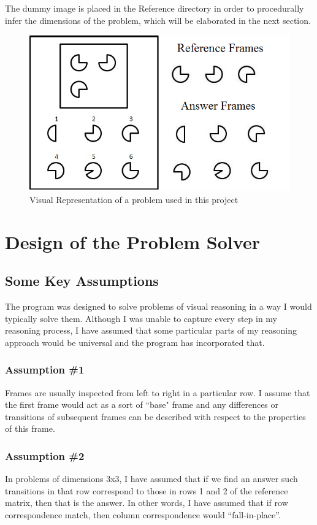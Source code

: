 \documentclass[10pt, letter]{article}
\begin{document}
The dummy image is placed in the Reference directory in order to procedurally infer the dimensions of the problem, which will be elaborated in the next section.

\begin{figure}[h!]
  \centering
    \includegraphics[scale = 0.5]{Images/Fig1}
    \caption{Visual Representation of a problem used in this project}
  \label{fig1}
\end{figure}

\section{Design of the Problem Solver}
\subsection*{Some Key Assumptions}
The program was designed to solve problems of visual reasoning in a way I would typically solve them. Although I was unable to capture every step in my reasoning process,  I have assumed that some particular parts of my reasoning approach would be universal and the program has incorporated that. 
	\subsubsection*{Assumption \#1}
Frames are usually inspected from left to right in a particular row. I assume that the first frame would act as a sort of ``base" frame and any differences or transitions of subsequent frames can be described with respect to the properties of this frame.
	\subsubsection*{Assumption \#2}
In problems of dimensions 3x3, I have assumed that if we find an answer such transitions in that row correspond to those in rows 1 and 2 of the reference matrix, then that is the answer. In other words, I have assumed that if row correspondence match, then column correspondence would ``fall-in-place''.
\end{document}
